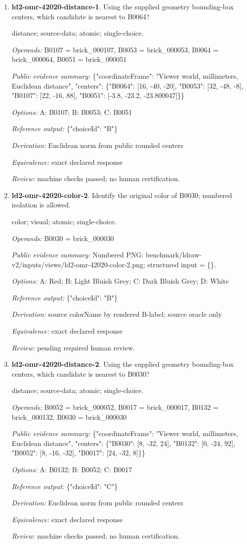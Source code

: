 \begin{enumerate}
\item \textbf{ld2-omr-42020-distance-1}. Using the supplied geometry bounding-box centers, which candidate is nearest to B0064?
\par{\small distance; source-data; atomic; single-choice.\par\textit{Operands:} B0107 = brick\_000107, B0053 = brick\_000053, B0064 = brick\_000064, B0051 = brick\_000051\par\textit{Public evidence summary:} \{"coordinateFrame": "Viewer world, millimeters, Euclidean distance", "centers": \{"B0064": [16, -40, -20], "B0053": [32, -48, -8], "B0107": [22, -16, 88], "B0051": [-3.8, -23.2, -23.800047]\}\}\par\textit{Options:} A: B0107; B: B0053; C: B0051\par\textit{Reference output:} \{"choiceId": "B"\}\par\textit{Derivation:} Euclidean norm from public rounded centers\par\textit{Equivalence:} exact declared response\par\textit{Review:} machine checks passed; no human certification.}
\item \textbf{ld2-omr-42020-color-2}. Identify the original color of B0030; numbered isolation is allowed.
\par{\small color; visual; atomic; single-choice.\par\textit{Operands:} B0030 = brick\_000030\par\textit{Public evidence summary:} Numbered PNG: benchmark/ldraw-v2/inputs/views/ld2-omr-42020-color-2.png; structured input = \{\}.\par\textit{Options:} A: Red; B: Light Bluish Grey; C: Dark Bluish Grey; D: White\par\textit{Reference output:} \{"choiceId": "B"\}\par\textit{Derivation:} source colorName by rendered B-label; source oracle only\par\textit{Equivalence:} exact declared response\par\textit{Review:} pending required human review.}
\item \textbf{ld2-omr-42020-distance-2}. Using the supplied geometry bounding-box centers, which candidate is nearest to B0030?
\par{\small distance; source-data; atomic; single-choice.\par\textit{Operands:} B0052 = brick\_000052, B0017 = brick\_000017, B0132 = brick\_000132, B0030 = brick\_000030\par\textit{Public evidence summary:} \{"coordinateFrame": "Viewer world, millimeters, Euclidean distance", "centers": \{"B0030": [8, -32, 24], "B0132": [0, -24, 92], "B0052": [8, -16, -32], "B0017": [24, -32, 8]\}\}\par\textit{Options:} A: B0132; B: B0052; C: B0017\par\textit{Reference output:} \{"choiceId": "C"\}\par\textit{Derivation:} Euclidean norm from public rounded centers\par\textit{Equivalence:} exact declared response\par\textit{Review:} machine checks passed; no human certification.}

\end{enumerate}

